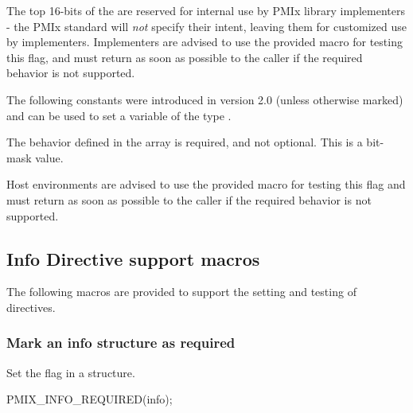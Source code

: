 \adviceimplstart
The top 16-bits of the  are reserved for internal use by \ac{PMIx} library implementers - the \ac{PMIx} standard will \textit{not} specify their intent, leaving them for customized use by implementers. Implementers are advised to use the provided  macro for testing this flag, and must return  as soon as possible to the caller if the required behavior is not supported.
\adviceimplend

The following constants were introduced in version 2.0 (unless otherwise marked) and can be used to set a variable of the type .

\begin{constantdesc}
%
The behavior defined in the  array is required, and not optional. This is a bit-mask value.
%
\end{constantdesc}

\advicermstart
Host environments are advised to use the provided  macro for testing this flag and must return  as soon as possible to the caller if the required behavior is not supported.
\advicermend


\subsection{Info Directive support macros}

The following macros are provided to support the setting and testing of  directives.

\subsubsection{Mark an info structure as required}

\summary

Set the  flag in a  structure.

\cspecificstart
\begin{codepar}
PMIX_INFO_REQUIRED(info);
\end{codepar}
\cspecificend

\begin{arglist}
\end{arglist}

